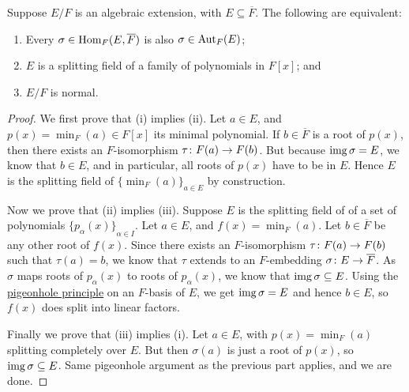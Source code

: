 \begin{theorem}\label{thm:normal-extension-equivalence}
    Suppose \(E/F\) is an algebraic extension, with \(E \subseteq \overline{F}\).
    The following are equivalent:
    \begin{enumerate}[label={(\roman*)}, itemsep=0mm]
        \item Every \(\sigma\in\operatorname{Hom}_F(E,\overline{F})\) is also \(\sigma\in\operatorname{Aut}_F(E)\);
        \item \(E\) is a splitting field of a family of polynomials in \(F[x]\); and
        \item \(E/F\) is normal.
    \end{enumerate}
\end{theorem}
\begin{proof}
    We first prove that (i) implies (ii).
    Let \(a \in E\), and \(p(x) = \min_F(a) \in F[x]\) its minimal polynomial.
    If \(b \in \overline{F}\) is a root of \(p(x)\),
    then there exists an \(F\)-isomorphism \(\tau\colon F(a)\to F(b)\).
    But because \(\operatorname{img}\sigma = E\), we know that \(b \in E\),
    and in particular, all roots of \(p(x)\) have to be in \(E\).
    Hence \(E\) is the splitting field of \({\{\min_F(a)\}}_{a \in E}\) by construction.

    Now we prove that (ii) implies (iii).
    Suppose \(E\) is the splitting field of of a set of polynomials \({\{p_\alpha(x)\}}_{\alpha \in I}\).
    Let \(a \in E\), and \(f(x) = \min_F(a)\).
    Let \(b \in \overline{F}\) be any other root of \(f(x)\).
    Since there exists an \(F\)-isomorphism \(\tau\colon F(a)\to F(b)\) such that \(\tau(a) = b\),
    we know that \(\tau\) extends to an \(F\)-embedding \(\sigma\colon E\to\overline{F}\).
    As \(\sigma\) maps roots of \(p_\alpha(x)\) to roots of \(p_\alpha(x)\),
    we know that \(\operatorname{img}\sigma \subseteq E\).
    Using the \hyperref[thm:pigeonhole]{pigeonhole principle} on an \(F\)-basis of \(E\),
    we get \(\operatorname{img}\sigma = E\) and hence \(b \in E\), so \(f(x)\) does split into linear factors.

    Finally we prove that (iii) implies (i).
    Let \(a \in E\), with \(p(x) = \min_F(a)\) splitting completely over \(E\).
    But then \(\sigma(a)\) is just a root of \(p(x)\), so \(\operatorname{img}\sigma \subseteq E\).
    Same pigeonhole argument as the previous part applies, and we are done.
\end{proof}

